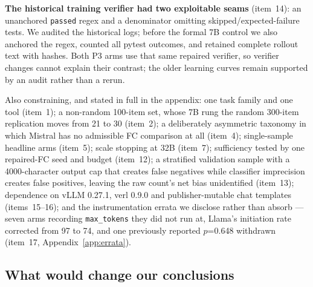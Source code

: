 \textbf{The historical training verifier had two exploitable seams} (item~14): an unanchored
\texttt{passed} regex and a denominator omitting skipped/expected-failure tests. We audited the
historical logs; before the formal 7B control we also anchored the regex, counted all pytest
outcomes, and retained complete rollout text with hashes. Both P3 arms use that same repaired
verifier, so verifier changes cannot explain their contrast; the older learning curves remain
supported by an audit rather than a rerun.

Also constraining, and stated in full in the appendix: one task family and one tool (item~1); a
non-random 100-item set, whose 7B rung the random 300-item replication moves from 21 to 30
(item~2); a deliberately asymmetric taxonomy in which Mistral has no admissible FC comparison at
all (item~4); single-sample headline arms (item~5); scale stopping at 32B (item~7); sufficiency
tested by one repaired-FC seed and budget (item~12); a stratified validation sample with a 4000-character output
cap that creates false negatives while classifier imprecision creates false positives, leaving
the raw count's net bias unidentified (item~13); dependence on vLLM 0.27.1, verl 0.9.0
and publisher-mutable chat templates (items~15--16); and the instrumentation errata we disclose
rather than absorb --- seven arms recording \texttt{max\_tokens} they did not run at, Llama's
initiation rate corrected from 97 to 74, and one previously reported $p$=0.648 withdrawn
(item~17, Appendix~\ref{app:errata}).

\subsection*{What would change our conclusions}
\label{sec:future}

